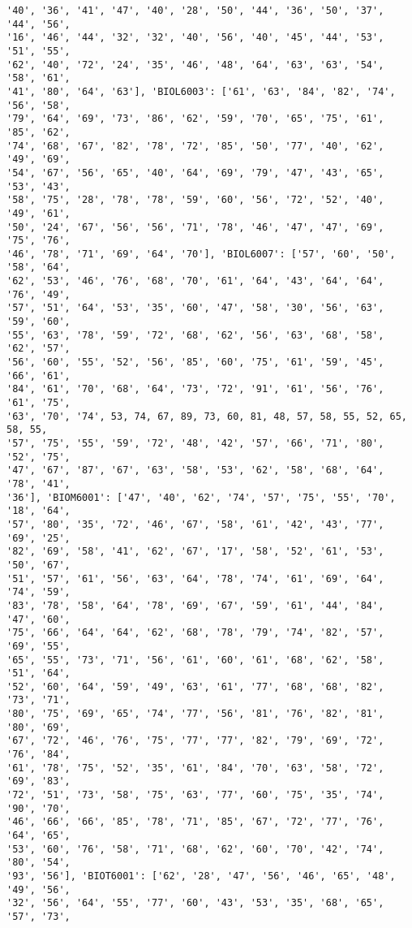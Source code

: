 \documentclass[11pt]{article}
\begin{document}
\begin{Verbatim}[commandchars=\\\{\}]
'40', '36', '41', '47', '40', '28', '50', '44', '36', '50', '37', '44', '56',
'16', '46', '44', '32', '32', '40', '56', '40', '45', '44', '53', '51', '55',
'62', '40', '72', '24', '35', '46', '48', '64', '63', '63', '54', '58', '61',
'41', '80', '64', '63'], 'BIOL6003': ['61', '63', '84', '82', '74', '56', '58',
'79', '64', '69', '73', '86', '62', '59', '70', '65', '75', '61', '85', '62',
'74', '68', '67', '82', '78', '72', '85', '50', '77', '40', '62', '49', '69',
'54', '67', '56', '65', '40', '64', '69', '79', '47', '43', '65', '53', '43',
'58', '75', '28', '78', '78', '59', '60', '56', '72', '52', '40', '49', '61',
'50', '24', '67', '56', '56', '71', '78', '46', '47', '47', '69', '75', '76',
'46', '78', '71', '69', '64', '70'], 'BIOL6007': ['57', '60', '50', '58', '64',
'62', '53', '46', '76', '68', '70', '61', '64', '43', '64', '64', '76', '49',
'57', '51', '64', '53', '35', '60', '47', '58', '30', '56', '63', '59', '60',
'55', '63', '78', '59', '72', '68', '62', '56', '63', '68', '58', '62', '57',
'56', '60', '55', '52', '56', '85', '60', '75', '61', '59', '45', '66', '61',
'84', '61', '70', '68', '64', '73', '72', '91', '61', '56', '76', '61', '75',
'63', '70', '74', 53, 74, 67, 89, 73, 60, 81, 48, 57, 58, 55, 52, 65, 58, 55,
'57', '75', '55', '59', '72', '48', '42', '57', '66', '71', '80', '52', '75',
'47', '67', '87', '67', '63', '58', '53', '62', '58', '68', '64', '78', '41',
'36'], 'BIOM6001': ['47', '40', '62', '74', '57', '75', '55', '70', '18', '64',
'57', '80', '35', '72', '46', '67', '58', '61', '42', '43', '77', '69', '25',
'82', '69', '58', '41', '62', '67', '17', '58', '52', '61', '53', '50', '67',
'51', '57', '61', '56', '63', '64', '78', '74', '61', '69', '64', '74', '59',
'83', '78', '58', '64', '78', '69', '67', '59', '61', '44', '84', '47', '60',
'75', '66', '64', '64', '62', '68', '78', '79', '74', '82', '57', '69', '55',
'65', '55', '73', '71', '56', '61', '60', '61', '68', '62', '58', '51', '64',
'52', '60', '64', '59', '49', '63', '61', '77', '68', '68', '82', '73', '71',
'80', '75', '69', '65', '74', '77', '56', '81', '76', '82', '81', '80', '69',
'67', '72', '46', '76', '75', '77', '77', '82', '79', '69', '72', '76', '84',
'61', '78', '75', '52', '35', '61', '84', '70', '63', '58', '72', '69', '83',
'72', '51', '73', '58', '75', '63', '77', '60', '75', '35', '74', '90', '70',
'46', '66', '66', '85', '78', '71', '85', '67', '72', '77', '76', '64', '65',
'53', '60', '76', '58', '71', '68', '62', '60', '70', '42', '74', '80', '54',
'93', '56'], 'BIOT6001': ['62', '28', '47', '56', '46', '65', '48', '49', '56',
'32', '56', '64', '55', '77', '60', '43', '53', '35', '68', '65', '57', '73',

\end{Verbatim}
\end{document}
